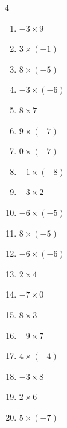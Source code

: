 \begin{multicols}{4}
\begin{enumerate}
  \item $-3\times 9$
        \phantom{$=-27$}

  \item $3\times (-1)$
        \phantom{$=-3$}

  \item $8\times (-5)$
        \phantom{$=-40$}

  \item $-3\times (-6)$
        \phantom{$=18$}

  \item $8\times 7$
        \phantom{$=56$}

  \item $9\times (-7)$
        \phantom{$=-63$}

  \item $0\times (-7)$
        \phantom{$=0$}

  \item $-1\times (-8)$
        \phantom{$=8$}

  \item $-3\times 2$
        \phantom{$=-6$}

  \item $-6\times (-5)$
        \phantom{$=30$}

  \item $8\times (-5)$
        \phantom{$=-40$}

  \item $-6\times (-6)$
        \phantom{$=36$}

  \item $2\times 4$
        \phantom{$=8$}

  \item $-7\times 0$
        \phantom{$=0$}

\columnbreak %

  \item $8\times 3$
        \phantom{$=24$}

  \item $-9\times 7$
        \phantom{$=-63$}

  \item $4\times (-4)$
        \phantom{$=-16$}

  \item $-3\times 8$
        \phantom{$=-24$}

  \item $2\times 6$
        \phantom{$=12$}

  \item $5\times (-7)$
        \phantom{$=-35$}


\end{enumerate}
\end{multicols}
